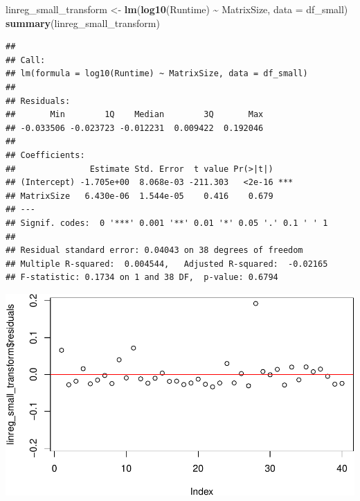 \documentclass[
]{article}
\newenvironment{Shaded}{\begin{snugshade}}{\end{snugshade}}
\newcommand{\CommentTok}[1]{\textcolor[rgb]{0.56,0.35,0.01}{\textit{#1}}}
\newcommand{\DataTypeTok}[1]{\textcolor[rgb]{0.13,0.29,0.53}{#1}}
\newcommand{\DecValTok}[1]{\textcolor[rgb]{0.00,0.00,0.81}{#1}}
\newcommand{\KeywordTok}[1]{\textcolor[rgb]{0.13,0.29,0.53}{\textbf{#1}}}
\newcommand{\NormalTok}[1]{#1}
\newcommand{\OperatorTok}[1]{\textcolor[rgb]{0.81,0.36,0.00}{\textbf{#1}}}
\newcommand{\StringTok}[1]{\textcolor[rgb]{0.31,0.60,0.02}{#1}}
\begin{document}
\begin{Shaded}
\begin{Highlighting}[]
\NormalTok{linreg\_small\_transform \textless{}{-}}\StringTok{ }\KeywordTok{lm}\NormalTok{(}\KeywordTok{log10}\NormalTok{(Runtime) }\OperatorTok{\textasciitilde{}}\StringTok{ }\NormalTok{MatrixSize, }\DataTypeTok{data =}\NormalTok{ df\_small)}
\KeywordTok{summary}\NormalTok{(linreg\_small\_transform)}
\end{Highlighting}
\end{Shaded}

\begin{verbatim}
## 
## Call:
## lm(formula = log10(Runtime) ~ MatrixSize, data = df_small)
## 
## Residuals:
##       Min        1Q    Median        3Q       Max 
## -0.033506 -0.023723 -0.012231  0.009422  0.192046 
## 
## Coefficients:
##               Estimate Std. Error  t value Pr(>|t|)    
## (Intercept) -1.705e+00  8.068e-03 -211.303   <2e-16 ***
## MatrixSize   6.430e-06  1.544e-05    0.416    0.679    
## ---
## Signif. codes:  0 '***' 0.001 '**' 0.01 '*' 0.05 '.' 0.1 ' ' 1
## 
## Residual standard error: 0.04043 on 38 degrees of freedom
## Multiple R-squared:  0.004544,   Adjusted R-squared:  -0.02165 
## F-statistic: 0.1734 on 1 and 38 DF,  p-value: 0.6794
\end{verbatim}

\begin{Shaded}
\end{Shaded}

\includegraphics{main_files/figure-latex/unnamed-chunk-19-3.pdf}
\end{document}
